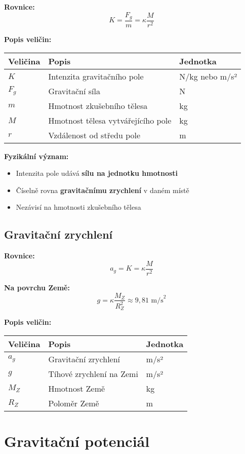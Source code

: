 \documentclass[11pt,a4paper]{article}
\begin{document}
\textbf{Rovnice:}
\[K = \frac{F_g}{m} = \kappa \frac{M}{r^2}\]

\textbf{Popis veličin:}

\begin{longtable}{lll}
\toprule
Veličina & Popis & Jednotka \\
\midrule
$K$ & Intenzita gravitačního pole & N/kg nebo m/s² \\
$F_g$ & Gravitační síla & N \\
$m$ & Hmotnost zkušebního tělesa & kg \\
$M$ & Hmotnost tělesa vytvářejícího pole & kg \\
$r$ & Vzdálenost od středu pole & m \\
\bottomrule
\end{longtable}

\textbf{Fyzikální význam:}

\begin{itemize}
\item Intenzita pole udává \textbf{sílu na jednotku hmotnosti}
\item Číselně rovna \textbf{gravitačnímu zrychlení} v daném místě
\item Nezávisí na hmotnosti zkušebního tělesa
\end{itemize}

\subsection{Gravitační zrychlení}

\textbf{Rovnice:}
\[a_g = K = \kappa \frac{M}{r^2}\]

\textbf{Na povrchu Země:}
\[g = \kappa \frac{M_Z}{R_Z^2} \approx 9{,}81 \text{ m/s}^2\]

\textbf{Popis veličin:}

\begin{longtable}{lll}
\toprule
Veličina & Popis & Jednotka \\
\midrule
$a_g$ & Gravitační zrychlení & m/s² \\
$g$ & Tíhové zrychlení na Zemi & m/s² \\
$M_Z$ & Hmotnost Země & kg \\
$R_Z$ & Poloměr Země & m \\
\bottomrule
\end{longtable}

\clearpage

\section{Gravitační potenciál}
\end{document}
